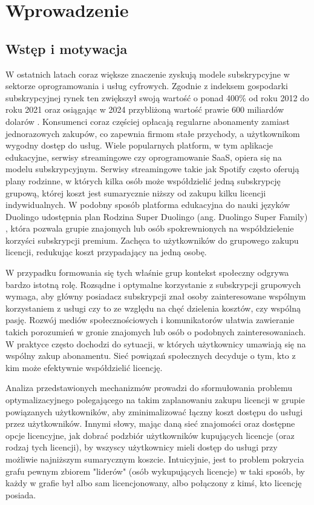 \chapter{Wprowadzenie}

\section{Wstęp i motywacja}
W ostatnich latach coraz większe znaczenie zyskują modele subskrypcyjne w sektorze oprogramowania i usług cyfrowych. Zgodnie z indeksem gospodarki subskrypcyjnej rynek ten zwiększył swoją wartość o ponad 400\% od roku 2012 do roku 2021 \cite{subscriptionEconomyIndex} oraz osiągając w 2024 przybliżoną wartość prawie 600 miliardów dolarów \cite{subscriptionEconomyPrice2024}. Konsumenci coraz częściej opłacają regularne abonamenty zamiast jednorazowych zakupów, co zapewnia firmom stałe przychody, a użytkownikom wygodny dostęp do usług. Wiele popularnych platform, w tym aplikacje edukacyjne, serwisy streamingowe czy oprogramowanie SaaS, opiera się na modelu subskrypcyjnym. Serwisy streamingowe takie jak Spotify często oferują plany rodzinne, w których kilka osób może współdzielić jedną subskrypcję grupową, której koszt jest sumarycznie niższy od zakupu kilku licencji indywidualnych. W podobny sposób platforma edukacyjna do nauki języków Duolingo udostępnia plan Rodzina Super Duolingo (ang. Duolingo Super Family) \cite{duolingo_family}, która pozwala grupie znajomych lub osób spokrewnionych na współdzielenie korzyści subskrypcji premium. Zachęca to użytkowników do grupowego zakupu licencji, redukując koszt przypadający na jedną osobę.

W przypadku formowania się tych właśnie grup kontekst społeczny odgrywa bardzo istotną rolę. Rozsądne i optymalne korzystanie z subskrypcji grupowych wymaga, aby główny posiadacz subskrypcji znał osoby zainteresowane wspólnym korzystaniem z usługi czy to ze względu na chęć dzielenia kosztów, czy wspólną pasję. Rozwój mediów społecznościowych i komunikatorów ułatwia zawieranie takich porozumień w gronie znajomych lub osób o podobnych zainteresowaniach. W praktyce często dochodzi do sytuacji, w których użytkownicy umawiają się na wspólny zakup abonamentu. Sieć powiązań społecznych decyduje o tym, kto z kim może efektywnie współdzielić licencję.

Analiza przedstawionych mechanizmów prowadzi do sformułowania problemu optymalizacyjnego polegającego na takim zaplanowaniu zakupu licencji w grupie powiązanych użytkowników, aby zminimalizować łączny koszt dostępu do usługi przez użytkowników. Innymi słowy, mając daną sieć znajomości oraz dostępne opcje licencyjne, jak dobrać podzbiór użytkowników kupujących licencje (oraz rodzaj tych licencji), by wszyscy użytkownicy mieli dostęp do usługi przy możliwie najniższym sumarycznym koszcie. Intuicyjnie, jest to problem pokrycia grafu pewnym zbiorem "liderów" (osób wykupujących licencje) w taki sposób, by każdy w grafie był albo sam licencjonowany, albo połączony z kimś, kto licencję posiada.

